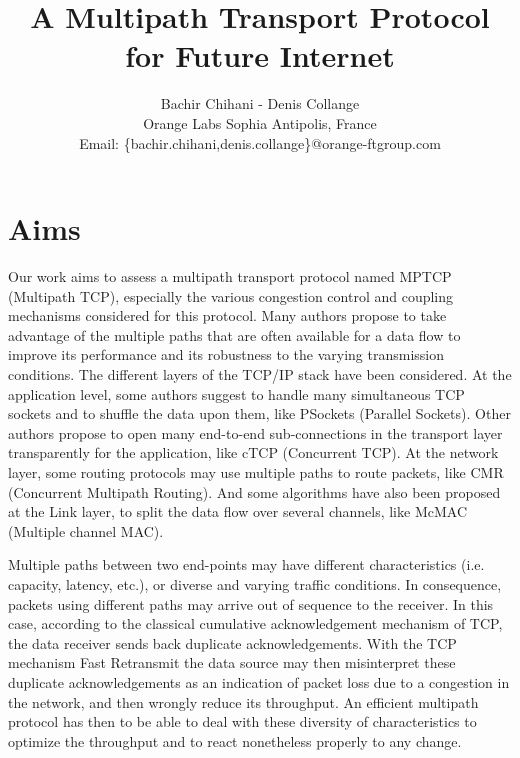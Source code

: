 \documentclass[10pt,a4paper]{article}
\begin{document}
\title{A Multipath Transport Protocol for Future Internet}


\author{Bachir Chihani - Denis Collange\\
Orange Labs  Sophia Antipolis, France\\
Email: \{bachir.chihani,denis.collange\}@orange-ftgroup.com\\
}
\maketitle

\section{Aims}
Our work aims to assess a multipath transport protocol named MPTCP (Multipath TCP), especially the various congestion control and coupling mechanisms considered for this protocol.
Many authors propose to take advantage of the multiple paths that are often available for a data flow to improve its performance and its robustness to the varying transmission conditions. The different layers of the TCP/IP stack have been considered. At the application level, some authors suggest to handle many simultaneous TCP sockets and to shuffle the data upon them, like PSockets (Parallel Sockets). Other authors propose to open many end-to-end sub-connections in the transport layer transparently for the application, like cTCP (Concurrent TCP). At the network layer, some routing protocols may use multiple paths to route packets, like CMR (Concurrent Multipath Routing). And some algorithms have also been proposed at the Link layer, to split the data flow over several channels, like McMAC (Multiple channel MAC).

Multiple paths between two end-points may have different characteristics (i.e. capacity, latency, etc.), or diverse and varying traffic conditions. In consequence, packets using different paths may arrive out of sequence to the receiver. In this case, according to the classical cumulative acknowledgement mechanism of TCP, the data receiver sends back duplicate acknowledgements. With the TCP mechanism Fast Retransmit the data source may then misinterpret these duplicate acknowledgements as an indication of packet loss due to a congestion in the network, and then wrongly reduce its throughput. 
An efficient multipath protocol has then to be able to deal with these diversity of characteristics to optimize the throughput and to react nonetheless properly to any change. 
\end{document}
